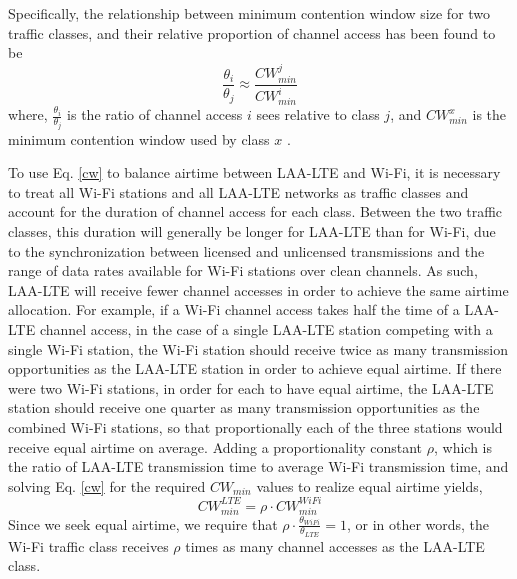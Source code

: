 Specifically, the relationship between minimum contention window size for two traffic classes, and their relative proportion of channel access has been found to be
\begin{equation}\label{cw}
\frac{\theta_i}{\theta_j} \approx \frac{CW^j_{min}}{CW^i_{min}}
\end{equation}
where, $\frac{\theta_i}{\theta_j}$ is the ratio of channel access $i$ sees relative to class $j$, and $CW^x_{min}$ is the minimum contention window used by class $x$ \cite{chou}\cite{yoon}.  

To use Eq. \ref{cw} to balance airtime between \mbox{\mbox{LAA-LTE}} and \mbox{\mbox{Wi-Fi}}, it is necessary to treat all \mbox{\mbox{Wi-Fi}} stations and all \mbox{LAA-LTE} networks as traffic classes and account for the duration of channel access for each class. Between the two traffic classes, this duration will generally be longer for \mbox{LAA-LTE} than for \mbox{Wi-Fi}, due to the synchronization between licensed and unlicensed transmissions and the range of data rates available for \mbox{Wi-Fi} stations over clean channels.  As such, \mbox{LAA-LTE} will receive fewer channel accesses in order to achieve the same airtime allocation. For example, if a \mbox{\mbox{Wi-Fi}} channel access takes half the time of a \mbox{\mbox{LAA-LTE}} channel access, in the case of a single \mbox{\mbox{LAA-LTE}} station competing with a single \mbox{\mbox{Wi-Fi}} station, the \mbox{\mbox{Wi-Fi}} station should receive twice as many transmission opportunities as the \mbox{\mbox{LAA-LTE}} station in order to achieve equal airtime.  If there were two \mbox{\mbox{Wi-Fi}} stations, in order for each to have equal airtime, the \mbox{\mbox{LAA-LTE}} station should receive one quarter as many transmission opportunities as the combined \mbox{\mbox{Wi-Fi}} stations, so that proportionally each of the three stations would receive equal airtime on average.  Adding a proportionality constant $\rho$, which is the ratio of \mbox{\mbox{LAA-LTE}} transmission time to average \mbox{\mbox{Wi-Fi}} transmission time, and solving Eq. \ref{cw} for the required $CW_{min}$ values to realize equal airtime yields,
\begin{equation}\label{cwlte}
CW^{LTE}_{min} = \rho\cdot{CW^{WiFi}_{min}}
\end{equation}
Since we seek equal airtime, we require that $\rho\cdot\frac{\theta_{WiFi}}{\theta_{LTE}} = 1$, or in other words, the \mbox{Wi-Fi} traffic class receives $\rho$ times as many channel accesses as the \mbox{LAA-LTE} class.

